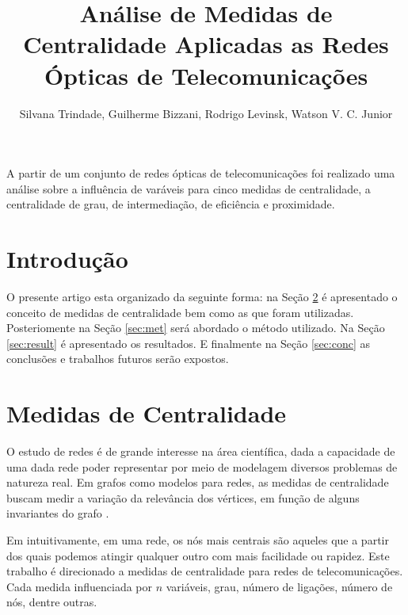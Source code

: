 \documentclass[12pt]{article}
\title{Análise de Medidas de Centralidade Aplicadas as Redes Ópticas de Telecomunicações}
\author{Silvana Trindade\inst{1}, Guilherme Bizzani\inst{1}, Rodrigo Levinsk\inst{1}, Watson V. C. Junior\inst{1}}
\begin{document}
 

\maketitle

\begin{abstract}
 
\end{abstract}
\begin{resumo} 
 A partir de um conjunto de redes ópticas de telecomunicações foi realizado uma análise sobre a influência de varáveis para cinco medidas de centralidade, a centralidade de grau, de intermediação, de eficiência e proximidade.

\end{resumo}


\section{Introdução}

O presente artigo esta organizado da seguinte forma: na Seção \ref{sec:mc} é apresentado o conceito de medidas de centralidade bem como as que foram utilizadas.
Posteriomente na  Seção \ref{sec:met} será abordado o método utilizado. 
Na Seção \ref{sec:result} é apresentado os resultados.
E finalmente na Seção \ref{sec:conc} as conclusões e trabalhos futuros serão expostos. 

\section{Medidas de Centralidade}\label{sec:mc}

O estudo de redes é de grande interesse na área científica, dada a capacidade de uma dada rede poder representar por meio de modelagem diversos problemas de natureza real.
Em grafos como modelos para redes, as medidas de centralidade buscam medir a variação da relevância dos vértices, em função de alguns invariantes do grafo \cite{freitas}.

Em \cite{freitas} intuitivamente, em uma rede, os nós mais centrais são aqueles que a partir dos quais podemos atingir qualquer outro com mais facilidade ou rapidez.
Este trabalho é direcionado a medidas de centralidade para redes de telecomunicações.
Cada medida influenciada por $n$ variáveis, grau, número de ligações, número de nós, dentre outras.
\end{document}
